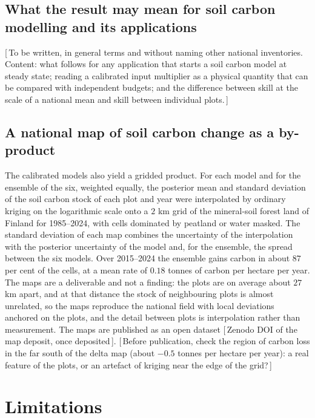 \documentclass[11pt]{article}
\newcommand{\gap}[1]{\textcolor{red!70!black}{\small[\,#1\,]}}
\begin{document}
\subsection{What the result may mean for soil carbon modelling and its applications}
\gap{To be written, in general terms and without naming other national inventories.
Content: what follows for any application that starts a soil carbon model at steady
state; reading a calibrated input multiplier as a physical quantity that can be
compared with independent budgets; and the difference between skill at the scale of a
national mean and skill between individual plots.}

\subsection{A national map of soil carbon change as a by-product}
The calibrated models also yield a gridded product. For each model and for the ensemble
of the six, weighted equally, the posterior mean and standard deviation of the soil
carbon stock of each plot and year were interpolated by ordinary kriging on the
logarithmic scale onto a $2$ km grid of the mineral-soil forest land of Finland for
1985--2024, with cells dominated by peatland or water masked. The standard deviation of
each map combines the uncertainty of the interpolation with the posterior uncertainty of
the model and, for the ensemble, the spread between the six models. Over 2015--2024 the
ensemble gains carbon in about $87$ per cent of the cells, at a mean rate of $0.18$ tonnes
of carbon per hectare per year. The maps are a deliverable and not a finding: the plots
are on average about $27$ km apart, and at that distance the stock of neighbouring plots
is almost unrelated, so the maps reproduce the national field with local deviations
anchored on the plots, and the detail between plots is interpolation rather than
measurement. The maps are published as an open dataset \gap{Zenodo DOI of the map
deposit, once deposited}.
\gap{Before publication, check the region of carbon loss in the far south of the delta
map (about $-0.5$ tonnes per hectare per year): a real feature of the plots, or an
artefact of kriging near the edge of the grid?}

\section{Limitations}
\end{document}
